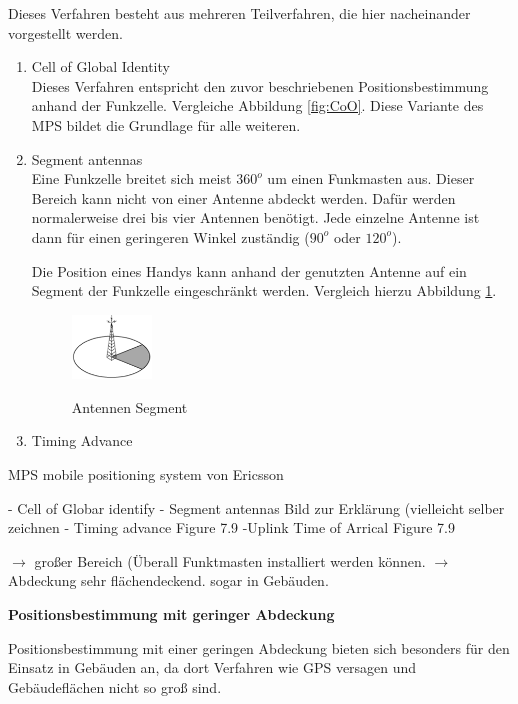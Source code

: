 Dieses Verfahren besteht aus mehreren Teilverfahren, die hier nacheinander vorgestellt werden.

\begin{enumerate}
\item Cell of Global Identity \\
Dieses Verfahren entspricht den zuvor beschriebenen Positionsbestimmung anhand der Funkzelle. Vergleiche Abbildung \ref{fig:CoO}. Diese Variante des MPS bildet die Grundlage für alle weiteren.
\item Segment antennas \\
Eine Funkzelle breitet sich meist $360^{o}$ um einen Funkmasten aus. Dieser Bereich kann nicht von einer Antenne abdeckt werden. Dafür werden normalerweise drei bis vier Antennen benötigt. Jede einzelne Antenne ist dann für einen geringeren Winkel zuständig ($90^{o}$ oder $120^{o}$).

Die Position eines Handys kann anhand der genutzten Antenne auf ein Segment der Funkzelle eingeschränkt werden.
Vergleich hierzu Abbildung \ref{fig:SA}.

\begin{figure}[h]
\centering
\includegraphics[width=0.2\textwidth]{ref/images/SegmentAntennas.PNG}
\caption[Antennen Segment]{Antennen Segment}
\label{fig:SA}
\cite[S. 209]{Schiller2004}
\end{figure}

\item Timing Advance
\end{enumerate}

MPS mobile positioning system von Ericsson

- Cell of Globar identify
- Segment antennas
Bild zur Erklärung (vielleicht selber zeichnen
- Timing advance
Figure 7.9
-Uplink Time of Arrical 
Figure 7.9

\cite[S. 206 - 209]{Schiller2004}



$\longrightarrow$ großer Bereich (Überall Funktmasten installiert werden können.
$\longrightarrow$ Abdeckung sehr flächendeckend. sogar in Gebäuden.

\textbf{Positionsbestimmung mit geringer Abdeckung}

Positionsbestimmung mit einer geringen Abdeckung bieten sich besonders für den Einsatz in Gebäuden an, da dort Verfahren wie GPS versagen und Gebäudeflächen nicht so groß sind. 

